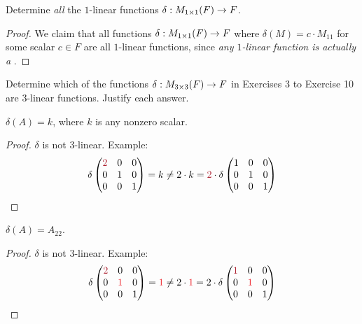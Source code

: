 \begin{exercise} \label{exercise 4.5.2}
Determine \emph{all} the \(1\)-linear functions \(\delta: M_{1 \times 1}(F) \to F\).
\end{exercise}

\begin{proof}
We claim that all functions \(\delta: M_{1 \times 1}(F) \to F\) where \(\delta(M) = c \cdot M_{11}\) for some scalar \(c \in F\) are all \(1\)-linear functions,
since \emph{any \(1\)-linear function is actually a \LTRAN{}}.
\end{proof}

Determine which of the functions \(\delta : M_{3 \times 3}(F) \to F\) in Exercises 3 to Exercise 10 are \(3\)-linear functions.
Justify each answer.

\begin{exercise} \label{exercise 4.5.3}
\(\delta(A) = k\), where \(k\) is any nonzero scalar.
\end{exercise}

\begin{proof}
\(\delta\) is not \(3\)-linear. Example:
\[
    \delta \begin{pmatrix}
        \MAROON{2} & 0 & 0 \\
        0 & 1 & 0 \\
        0 & 0 & 1
    \end{pmatrix} = k \ne 2 \cdot k
    = \MAROON{2} \cdot \delta \begin{pmatrix}
        1 & 0 & 0 \\
        0 & 1 & 0 \\
        0 & 0 & 1
    \end{pmatrix}
\]
\end{proof}

\begin{exercise} \label{exercise 4.5.4}
\(\delta(A)= A_{22}\).
\end{exercise}

\begin{proof}
\(\delta\) is not \(3\)-linear. Example:
\[
    \delta \begin{pmatrix}
        \MAROON{2} & 0 & 0 \\
        0 & \RED{1} & 0 \\
        0 & 0 & 1
    \end{pmatrix} = \RED{1} \ne 2 \cdot \RED{1} = 2 \cdot \delta
    \begin{pmatrix}
        \MAROON{1} & 0 & 0 \\
        0 & \RED{1} & 0 \\
        0 & 0 & 1
    \end{pmatrix}
\]
\end{proof}

